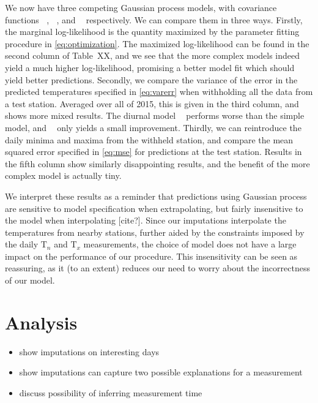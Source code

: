 \documentclass[letter]{article}
\providecommand{\tightlist}{%
      \setlength{\itemsep}{0pt}\setlength{\parskip}{0pt}}
\newcommand{\T}{\mathrm{T}}
\newcommand{\Tn}{\T_{n}}
\newcommand{\Tx}{\T_{x}}
\DeclareMathOperator{\kSESE}{k_{\mathtt{SExSE}}}
\DeclareMathOperator{\kdiurn}{k_{\mathtt{SESE_24}}}
\DeclareMathOperator{\ksumprod}{k_{\mathtt{sumprod}}}
\providecommand{\tightlist}{%
  	  \setlength{\itemsep}{0pt}\setlength{\parskip}{0pt}}
\begin{document}
We now have three competing Gaussian process models, with covariance
functions \(\kSESE\), \(\kdiurn\), and \(\ksumprod\) respectively. We
can compare them in three ways. Firstly, the marginal log-likelihood is
the quantity maximized by the parameter fitting procedure in
\eqref{eq:optimization}. The maximized log-likelihood can be found in
the second column of Table~XX, and we see that the more complex models
indeed yield a much higher log-likelihood, promising a better model fit
which should yield better predictions. Secondly, we compare the variance
of the error in the predicted temperatures specified in
\eqref{eq:varerr} when withholding all the data from a test station.
Averaged over all of 2015, this is given in the third column, and shows
more mixed results. The diurnal model \(\kdiurn\) performs worse than
the simple \(\kSESE\) model, and \(\ksumprod\) only yields a small
improvement. Thirdly, we can reintroduce the daily minima and maxima
from the withheld station, and compare the mean squared error specified
in \eqref{eq:mse} for predictions at the test station. Results in the
fifth column show similarly disappointing results, and the benefit of
the more complex model is actually tiny.

We interpret these results as a reminder that predictions using Gaussian
process are sensitive to model specification when extrapolating, but
fairly insensitive to the model when interpolating {[}cite?{]}. Since
our imputations interpolate the temperatures from nearby stations,
further aided by the constraints imposed by the daily \(\Tn\) and
\(\Tx\) measurements, the choice of model does not have a large impact
on the performance of our procedure. This insensitivity can be seen as
reassuring, as it (to an extent) reduces our need to worry about the
incorrectness of our model.
    


    	\section{Analysis}\label{analysis}

\begin{itemize}
\tightlist
\item
  show imputations on interesting days
\item
  show imputations can capture two possible explanations for a
  measurement
\item
  discuss possibility of inferring measurement time
\end{itemize}
    
\end{document}
